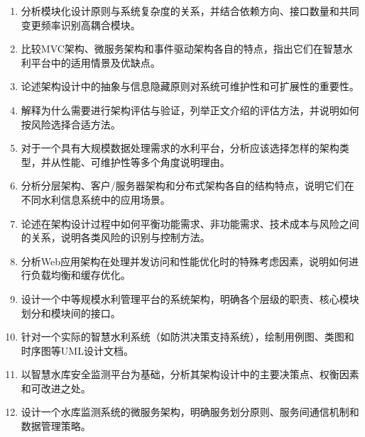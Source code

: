 \begin{enumerate}
\item 分析模块化设计原则与系统复杂度的关系，并结合依赖方向、接口数量和共同变更频率识别高耦合模块。
\item 比较MVC架构、微服务架构和事件驱动架构各自的特点，指出它们在智慧水利平台中的适用情景及优缺点。
\item 论述架构设计中的抽象与信息隐藏原则对系统可维护性和可扩展性的重要性。
\item 解释为什么需要进行架构评估与验证，列举正文介绍的评估方法，并说明如何按风险选择合适方法。
\item 对于一个具有大规模数据处理需求的水利平台，分析应该选择怎样的架构类型，并从性能、可维护性等多个角度说明理由。
\item 分析分层架构、客户/服务器架构和分布式架构各自的结构特点，说明它们在不同水利信息系统中的应用场景。
\item 论述在架构设计过程中如何平衡功能需求、非功能需求、技术成本与风险之间的关系，说明各类风险的识别与控制方法。
\item 分析Web应用架构在处理并发访问和性能优化时的特殊考虑因素，说明如何进行负载均衡和缓存优化。
\item 设计一个中等规模水利管理平台的系统架构，明确各个层级的职责、核心模块划分和模块间的接口。
\item 针对一个实际的智慧水利系统（如防洪决策支持系统），绘制用例图、类图和时序图等UML设计文档。
\item 以智慧水库安全监测平台为基础，分析其架构设计中的主要决策点、权衡因素和可改进之处。
\item 设计一个水库监测系统的微服务架构，明确服务划分原则、服务间通信机制和数据管理策略。
\end{enumerate}
